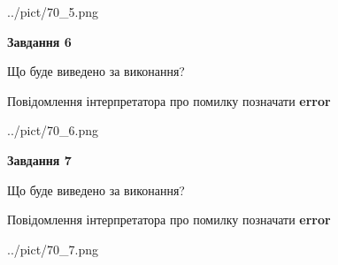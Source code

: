\documentclass[10pt, ukrainian]{article}
\begin{document}
{\begin {large}
\begin{center}
	{../pict/70_5.png}
\end{center}
\newpage

{\begin {center}\textbf{Завдання 6}\end {center}}\par
Що буде виведено за виконання? \par
Повідомлення інтерпретатора про помилку позначати \textbf{error}

\begin{center}
	{../pict/70_6.png}
\end{center}
\newpage

{\begin {center}\textbf{Завдання 7}\end {center}}\par
Що буде виведено за виконання? \par
Повідомлення інтерпретатора про помилку позначати \textbf{error}

\begin{center}
	{../pict/70_7.png}
\end{center}
\newpage

\end {large}}
\end{document}
